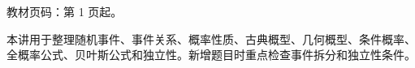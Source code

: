 
\begin{knowledgeBox}
教材页码：第 1 页起。

本讲用于整理随机事件、事件关系、概率性质、古典概型、几何概型、条件概率、全概率公式、贝叶斯公式和独立性。新增题目时重点检查事件拆分和独立性条件。
\end{knowledgeBox}
